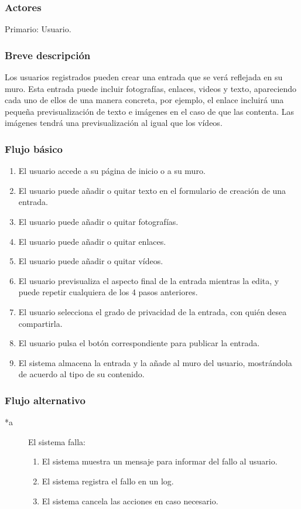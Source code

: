 \documentclass[12pt, a4paper, titlepage]{article}
\begin{document}
\subsubsection{Actores}
Primario: Usuario.
\subsubsection{Breve descripción}
Los usuarios registrados pueden crear una entrada que se verá reflejada en su muro. Esta entrada puede incluir fotografías, enlaces, videos y texto, apareciendo cada uno de ellos de una manera concreta, por ejemplo, el enlace incluirá una pequeña previsualización de texto e imágenes en el caso de que las contenta. Las imágenes tendrá una previsualización al igual que los vídeos.
\subsubsection{Flujo básico}
\begin{enumerate}
	\item El usuario accede a su página de inicio o a su muro.
	\item El usuario puede añadir o quitar texto en el formulario de creación de una entrada.
	\item El usuario puede añadir o quitar fotografías.
	\item El usuario puede añadir o quitar enlaces.
	\item El usuario puede añadir o quitar vídeos.
	\item El usuario previsualiza el aspecto final de la entrada mientras la edita, y puede repetir cualquiera de los 4 pasos anteriores.
	\item El usuario selecciona el grado de privacidad de la entrada, con quién desea compartirla.
	\item El usuario pulsa el botón correspondiente para publicar la entrada.
	\item El sistema almacena la entrada y la añade al muro del usuario, mostrándola de acuerdo al tipo de su contenido.
\end{enumerate}
\subsubsection{Flujo alternativo}

\begin{description}
	\item [*a] El sistema falla:
	\begin{enumerate}
		\item El sistema muestra un mensaje para informar del fallo al usuario.
		\item El sistema registra el fallo en un log.
		\item El sistema cancela las acciones en caso necesario.
	\end{enumerate}
\end{description}
\end{document}
